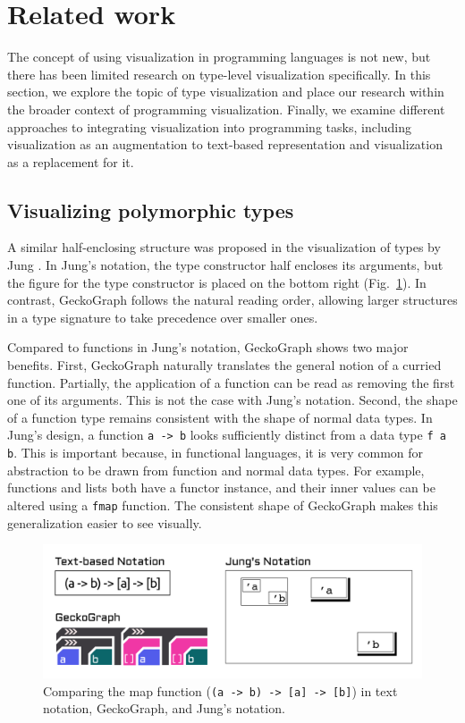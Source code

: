 \section{Related work}
The concept of using visualization in programming languages is not new, but there has been limited research on type-level visualization specifically. In this section, we explore the topic of type visualization and place our research within the broader context of programming visualization. Finally, we examine different approaches to integrating visualization into programming tasks, including visualization as an augmentation to text-based representation and visualization as a replacement for it.

\subsection{Visualizing polymorphic types}
A similar half-enclosing structure was proposed in the visualization of types by Jung \cite{Jung2000-oc}. In Jung's notation, the type constructor half encloses its arguments, but the figure for the type constructor is placed on the bottom right (Fig.~\ref{fig:jung}).  In contrast, GeckoGraph follows the natural reading order, allowing larger structures in a type signature to take precedence over smaller ones. 

Compared to functions in Jung's notation,  GeckoGraph shows two major benefits. First, GeckoGraph naturally translates the general notion of a curried function. Partially, the application of a function can be read as removing the first one of its arguments. This is not the case with Jung's notation. Second, the shape of a function type remains consistent with the shape of normal data types. In Jung's design, a function \texttt{a -> b} looks sufficiently distinct from a data type \texttt{f a b}. This is important because, in functional languages, it is very common for abstraction to be drawn from function and normal data types. For example,  functions and lists both have a functor instance, and their inner values can be altered using a \texttt{fmap} function. The consistent shape of GeckoGraph makes this generalization easier to see visually. 

\begin{figure}[hbt]
  \includegraphics[width=\linewidth]{figures/Jung}
  \caption[Comparing GeckoGraph with Jung's notation]{
        \label{fig:jung}
        Comparing the map function (\texttt{(a -> b) -> [a] -> [b]}) in text notation, GeckoGraph, and Jung's notation.
  }
\end{figure}

